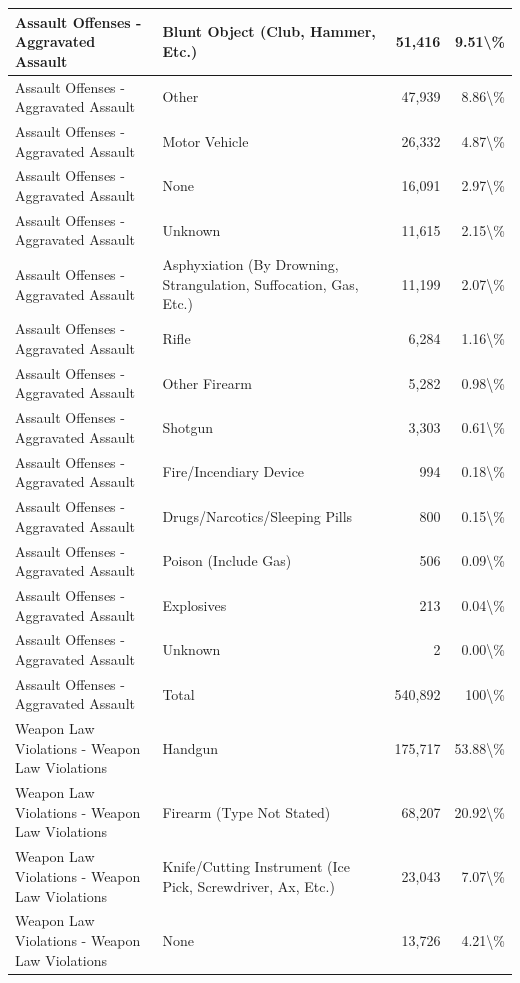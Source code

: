 \documentclass[
]{krantz}
\begin{document}
\begin{longtable}[t]{l|l|r|r}
\hline
Assault Offenses - Aggravated Assault & Blunt Object (Club, Hammer, Etc.) & 51,416 & 9.51\textbackslash{}\%\\
\hline
Assault Offenses - Aggravated Assault & Other & 47,939 & 8.86\textbackslash{}\%\\
\hline
Assault Offenses - Aggravated Assault & Motor Vehicle & 26,332 & 4.87\textbackslash{}\%\\
\hline
Assault Offenses - Aggravated Assault & None & 16,091 & 2.97\textbackslash{}\%\\
\hline
Assault Offenses - Aggravated Assault & Unknown & 11,615 & 2.15\textbackslash{}\%\\
\hline
Assault Offenses - Aggravated Assault & Asphyxiation (By Drowning, Strangulation, Suffocation, Gas, Etc.) & 11,199 & 2.07\textbackslash{}\%\\
\hline
Assault Offenses - Aggravated Assault & Rifle & 6,284 & 1.16\textbackslash{}\%\\
\hline
Assault Offenses - Aggravated Assault & Other Firearm & 5,282 & 0.98\textbackslash{}\%\\
\hline
Assault Offenses - Aggravated Assault & Shotgun & 3,303 & 0.61\textbackslash{}\%\\
\hline
Assault Offenses - Aggravated Assault & Fire/Incendiary Device & 994 & 0.18\textbackslash{}\%\\
\hline
Assault Offenses - Aggravated Assault & Drugs/Narcotics/Sleeping Pills & 800 & 0.15\textbackslash{}\%\\
\hline
Assault Offenses - Aggravated Assault & Poison (Include Gas) & 506 & 0.09\textbackslash{}\%\\
\hline
Assault Offenses - Aggravated Assault & Explosives & 213 & 0.04\textbackslash{}\%\\
\hline
Assault Offenses - Aggravated Assault & Unknown & 2 & 0.00\textbackslash{}\%\\
\hline
Assault Offenses - Aggravated Assault & Total & 540,892 & 100\textbackslash{}\%\\
\hline
Weapon Law Violations - Weapon Law Violations & Handgun & 175,717 & 53.88\textbackslash{}\%\\
\hline
Weapon Law Violations - Weapon Law Violations & Firearm (Type Not Stated) & 68,207 & 20.92\textbackslash{}\%\\
\hline
Weapon Law Violations - Weapon Law Violations & Knife/Cutting Instrument (Ice Pick, Screwdriver, Ax, Etc.) & 23,043 & 7.07\textbackslash{}\%\\
\hline
Weapon Law Violations - Weapon Law Violations & None & 13,726 & 4.21\textbackslash{}\%\\

\end{longtable}
\end{document}
